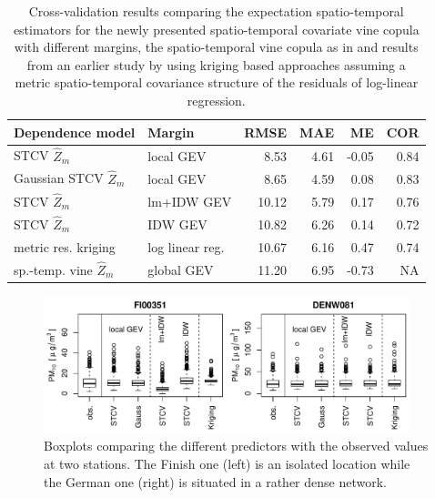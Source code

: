 \documentclass[article,nojss]{jss}
\begin{document}
\begin{table}
\center
\begin{tabular}{ll|rrrr}
Dependence model & Margin & RMSE & MAE & ME & COR \\ \hline 
\rule{0pt}{14pt}STCV $\widehat{Z}_m$ & local GEV & 8.53 & 4.61 & -0.05 & 0.84 \\
Gaussian STCV $\widehat{Z}_m$  & local GEV & 8.65 & 4.59 & 0.08 & 0.83 \\
STCV $\widehat{Z}_m$ & lm+IDW GEV& 10.12 & 5.79 & 0.17 & 0.76 \\
STCV $\widehat{Z}_m$ & IDW GEV&  10.82 & 6.26 & 0.14 & 0.72 \\
metric res. kriging & log linear reg. & 10.67 & 6.16 & 0.47 & 0.74 \\
sp.-temp. vine $\widehat{Z}_m$ & global GEV & 11.20 & 6.95 & -0.73 & NA 
\end{tabular}
\caption{Cross-validation results comparing the expectation spatio-temporal estimators for the newly presented spatio-temporal covariate vine copula with different margins, the spatio-temporal vine copula as in \citet{Graler2012a} and results from an earlier study by \citet{Graler2012} using kriging based approaches assuming a metric spatio-temporal covariance structure of the residuals of log-linear regression.}\label{tab:cross-validation}
\end{table}

\begin{figure}
\center
\includegraphics[width=0.95\textwidth]{BoxPlots.pdf}
\caption{Boxplots comparing the different predictors with the observed values at two stations. The Finish one (left) is an isolated location while the German one (right) is situated in a rather dense network.\label{fig:boxplots}}
\end{figure}
\end{document}
